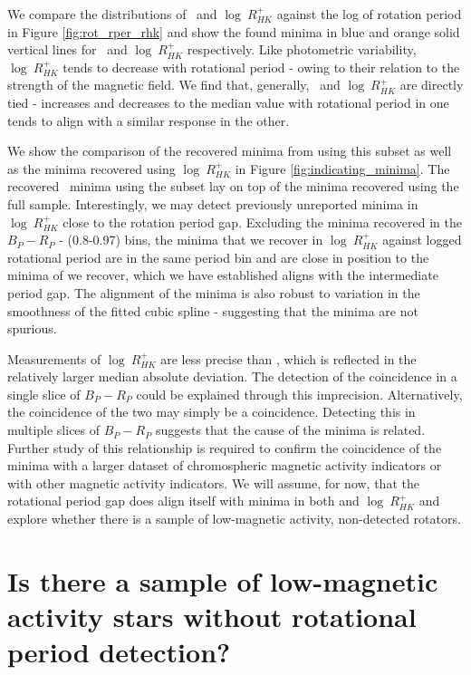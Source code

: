 We compare the distributions of \rper{} \ and $\log \ R^{+}_{HK}$ against the log of rotation period in Figure \ref{fig:rot_rper_rhk} and show the found minima in blue and orange solid vertical lines for \rper{} \ and $\log \ R^{+}_{HK}$ respectively.
Like photometric variability, $\log \ R^{+}_{HK}$ tends to decrease with rotational period - owing to their relation to the strength of the magnetic field.
We find that, generally, \rper{} \ and $\log \ R^{+}_{HK}$ are directly tied - increases and decreases to the median value with rotational period in one tends to align with a similar response in the other.

We show the comparison of the recovered minima from \rper{} using this subset as well as the minima recovered using $\log \ R^{+}_{HK}$ in Figure \ref{fig:indicating_minima}.
The recovered \rper{} \ minima using the subset lay on top of the \rper{} minima recovered using the full sample.
Interestingly, we may detect previously unreported minima in $\log \ R^{+}_{HK}$ close to the rotation period gap.
Excluding the minima recovered in the $B_P-R_P$ - (0.8-0.97) bins, the minima that we recover in $\log \ R^{+}_{HK}$ against logged rotational period are in the same period bin and are close in position to the minima of \rper{} we recover, which we have established aligns with the intermediate period gap.
The alignment of the minima is also robust to variation in the smoothness of the fitted cubic spline - suggesting that the minima are not spurious.

Measurements of $\log \ R^{+}_{HK}$ are less precise than \rper{}, which is reflected in the relatively larger median absolute deviation.
The detection of the coincidence in a single slice of $B_P-R_P$ could be explained through this imprecision.
Alternatively, the coincidence of the two may simply be a coincidence.
Detecting this in multiple slices of $B_P-R_P$ suggests that the cause of the minima is related.
Further study of this relationship is required to confirm the coincidence of the minima with a larger dataset of chromospheric magnetic activity indicators or with other magnetic activity indicators.
We will assume, for now, that the rotational period gap does align itself with minima in both \rper{} and $\log \ R^{+}_{HK}$ and explore whether there is a sample of low-magnetic activity, non-detected rotators.

\section{Is there a sample of low-magnetic activity stars without rotational period detection?}
\label{sec:low_activity_gap}

